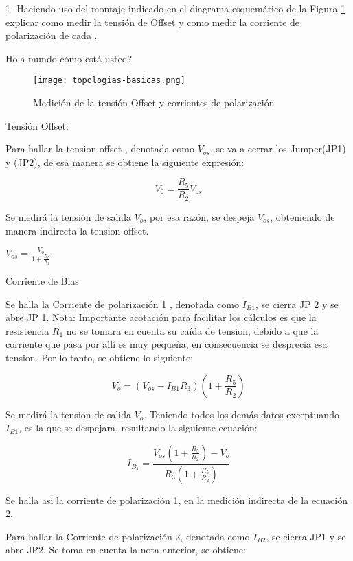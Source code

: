 1- Haciendo uso del montaje indicado en el diagrama esquemático de la Figura \ref{fig:offset-y-bias} explicar como medir la tensión de
Offset y como medir la corriente de polarización de cada
.

Hola mundo cómo está usted? 

\begin{figure}[ht]
    \centering
    \texttt{[image: topologias-basicas.png]}
    \caption{Medición de la tensión Offset y corrientes de polarización}
    \label{fig:offset-y-bias}
\end{figure}

Tensión Offset:

Para hallar la tension offset  , denotada como $V_{os}$, se va a cerrar los Jumper(JP1) y
(JP2), de esa manera se obtiene la siguiente expresión: 

\begin{equation}
    V_0=\frac{R_5}{R_2}V_{os}
\end{equation}

Se medirá la tensión de salida  $V_o$, por esa razón, se despeja  $V_{os}$, obteniendo de manera indirecta la tension offset.

$V_{os}=\frac{V_o}{1+\frac{R_5}{R_2}}$

Corriente de Bias

 Se halla la Corriente de polarización 1 , denotada como $I_{B1}$, se cierra JP 2 y se abre JP 1. Nota: Importante acotación para facilitar los cálculos es que la resistencia  $R_1$ no se tomara en cuenta su caída de tension, debido a que la corriente que pasa por allí es muy pequeña, en consecuencia se desprecia esa tension. Por lo tanto, se obtiene lo siguiente:

 \begin{equation}
    V_o = (V_{os} - I_{B1}R_3)(1 + \frac{R_5}{R_2})
 \end{equation}

 Se medirá la tension de salida  $V_o$. Teniendo todos los demás datos exceptuando $I_{B1}$, es la que se despejara, resultando la siguiente ecuación:


 \begin{equation}
 I_{B_1} = \frac{V_{os} \left( 1 + \frac{R_5}{R_2} \right) - V_o}{R_3 \left( 1 + \frac{R_5}{R_2} \right)}
 \end{equation}

 Se halla asi la corriente de polarización 1, en la medición indirecta de la ecuación 2.

Para hallar la Corriente de polarización 2, denotada como $I_{B2}$, se cierra JP1 y se
abre JP2. Se toma en cuenta la nota anterior, se obtiene:

